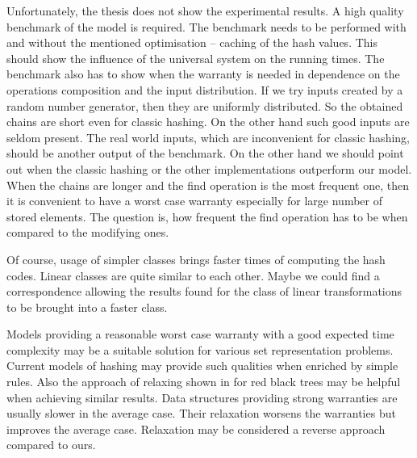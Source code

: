 Unfortunately, the thesis does not show the experimental results. A high quality benchmark of the model is required. The benchmark needs to be performed with and without the mentioned optimisation -- caching of the hash values. This should show the influence of the universal system on the running times. The benchmark also has to show when the warranty is needed in dependence on the operations composition and the input distribution. If we try inputs created by a random number generator, then they are uniformly distributed. So the obtained chains are short even for classic hashing. On the other hand such good inputs are seldom present. The real world inputs, which are inconvenient for classic hashing, should be another output of the benchmark. On the other hand we should point out when the classic hashing or the other implementations outperform our model. When the chains are longer and the find operation is the most frequent one, then it is convenient to have a worst case warranty especially for large number of stored elements. The question is, how frequent the find operation has to be when compared to the modifying ones.

Of course, usage of simpler classes brings faster times of computing the hash codes. Linear classes are quite similar to each other. Maybe we could find a correspondence allowing the results found for the class of linear transformations to be brought into a faster class.

Models providing a reasonable worst case warranty with a good expected time complexity may be a suitable solution for various set representation problems. Current models of hashing may provide such qualities when enriched by simple rules. Also the approach of relaxing shown in \cite{752883} for red black trees may be helpful when achieving similar results.  Data structures providing strong warranties are usually slower in the average case. Their relaxation worsens the warranties but improves the average case. Relaxation may be considered a reverse approach compared to ours.
